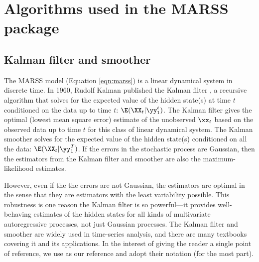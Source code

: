 \chapter{Algorithms used in the MARSS package}\label{chap:algorithms}

\section{Kalman filter and smoother}\label{sec:kalmanfilter}

The MARSS model (Equation \ref{eqn:marss}) is a linear dynamical system in discrete time.  In 1960, Rudolf Kalman published the Kalman filter \citep{Kalman1960}, a recursive algorithm that solves for the expected value of the hidden state(s) at time $t$ conditioned on the data up to time $t$: $\E(\XX_t|\yy_1^t)$.  The Kalman filter gives the optimal (lowest mean square error) estimate of the unobserved $\xx_t$ based on the observed data up to time $t$ for this class of linear dynamical system.  The Kalman smoother \citep{Rauchetal1965} solves for the expected value of the hidden state(s) conditioned on all the data: $\E(\XX_t|\yy_1^T)$.  If the errors in the stochastic process are Gaussian, then the estimators from the Kalman filter and smoother are also the maximum-likelihood estimates.  

However, even if the the errors are not Gaussian, the estimators are optimal in the sense that they are estimators with the least variability possible.  This robustness is one reason the Kalman filter is so powerful---it provides well-behaving estimates of the hidden states for all kinds of multivariate autoregressive processes, not just Gaussian processes.  The Kalman filter and smoother are widely used in time-series analysis, and there are many textbooks covering it and its applications.  In the interest of giving the reader a single point of reference, we use \citet{ShumwayStoffer2006} as our reference and adopt their notation (for the most part).

